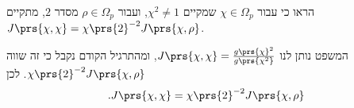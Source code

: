 \documentclass[a4paper,10pt,twoside,openany]{book}
\begin{document}

\begin{exercisechap}
הראו כי עבור
$\chi \in \Omega_p$
שמקיים
$\chi^2 \neq 1$,
ועבור
$\rho \in \Omega_p$
מסדר
$2$,
מתקיים
$J\prs{\chi, \chi} = \chi\prs{2}^{-2} J\prs{\chi, \rho}$.
\end{exercisechap}

\begin{solution}
המשפט נותן לנו
$J\prs{\chi, \chi} = \frac{g\prs{\chi}^2}{g\prs{\chi^2}}$,
ומהתרגיל הקודם נקבל כי זה שווה
$\chi\prs{2}^{-2} J\prs{\chi, \rho}$.
לכן
\[\text{.} J\prs{\chi, \chi} = \chi\prs{2}^{-2} J\prs{\chi, \rho}\]
\end{solution}

\printbibliography
\end{document}
